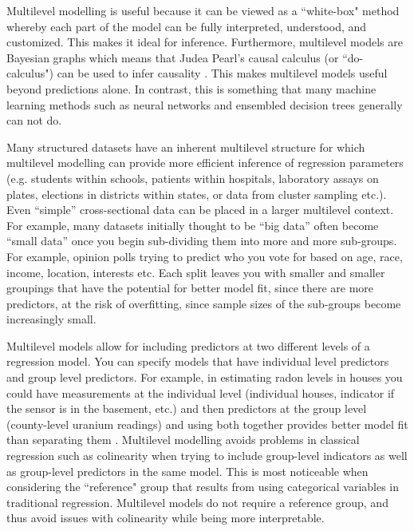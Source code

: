Multilevel modelling is useful because it can be viewed as a ``white-box" method whereby each part of the model can be fully interpreted, understood, and customized. This makes it ideal for inference. Furthermore, multilevel models are Bayesian graphs which means that Judea Pearl’s causal calculus (or ``do-calculus") can be used to infer causality \cite{Pearl2000}. This makes multilevel models useful beyond predictions alone. In contrast, this is something that many machine learning methods such as neural networks and ensembled decision trees generally can not do.

Many structured datasets have an inherent multilevel structure for which multilevel modelling can provide more efficient inference of regression parameters (e.g. students within schools, patients within hospitals, laboratory assays on plates, elections in districts within states, or data from cluster sampling etc.). Even “simple” cross-sectional data can be placed in a larger multilevel context. For example, many datasets initially thought to be ``big data” often become ``small data” once you begin sub-dividing them into more and more sub-groups. For example, opinion polls trying to predict who you vote for based on age, race, income, location, interests etc. Each split leaves you with smaller and smaller groupings that have the potential for better model fit, since there are more predictors, at the risk of overfitting, since sample sizes of the sub-groups become increasingly small.

Multilevel models allow for including predictors at two different levels of a regression model. You can specify models that have individual level predictors and group level predictors. For example, in estimating radon levels in houses you could have measurements at the individual level (individual houses, indicator if the sensor is in the basement, etc.) and then predictors at the group level (county-level uranium readings) and using both together provides better model fit than separating them \cite{Gelman2006b}. Multilevel modelling avoids problems in classical regression such as colinearity when trying to include group-level indicators as well as group-level predictors in the same model. This is most noticeable when considering the ``reference" group that results from using categorical variables in traditional regression. Multilevel models do not require a reference group, and thus avoid issues with colinearity while being more interpretable.

